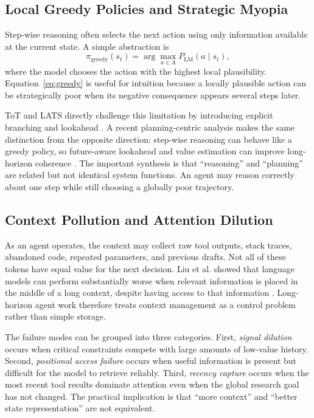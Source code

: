 \documentclass[manuscript,screen]{acmart}
\begin{document}
\subsection{Local Greedy Policies and Strategic Myopia}
Step-wise reasoning often selects the next action using only information available at the current state. A simple abstraction is
\begin{equation}
\pi_{\mathrm{greedy}}(s_t)=\arg\max_{a\in A} P_{\mathrm{LM}}(a\mid s_t),
\label{eq:greedy}
\end{equation}
where the model chooses the action with the highest local plausibility. Equation~\ref{eq:greedy} is useful for intuition because a locally plausible action can be strategically poor when its negative consequence appears several steps later.

ToT and LATS directly challenge this limitation by introducing explicit branching and lookahead \cite{yao2023tot,zhou2023lats}. A recent planning-centric analysis makes the same distinction from the opposite direction: step-wise reasoning can behave like a greedy policy, so future-aware lookahead and value estimation can improve long-horizon coherence \cite{wang2026flare}. The important synthesis is that ``reasoning'' and ``planning'' are related but not identical system functions. An agent may reason correctly about one step while still choosing a globally poor trajectory.

\subsection{Context Pollution and Attention Dilution}
As an agent operates, the context may collect raw tool outputs, stack traces, abandoned code, repeated parameters, and previous drafts. Not all of these tokens have equal value for the next decision. Liu et al. showed that language models can perform substantially worse when relevant information is placed in the middle of a long context, despite having access to that information \cite{liu2023lostmiddle}. Long-horizon agent work therefore treats context management as a control problem rather than simple storage.

The failure modes can be grouped into three categories. First, \emph{signal dilution} occurs when critical constraints compete with large amounts of low-value history. Second, \emph{positional access failure} occurs when useful information is present but difficult for the model to retrieve reliably. Third, \emph{recency capture} occurs when the most recent tool results dominate attention even when the global research goal has not changed. The practical implication is that ``more context'' and ``better state representation'' are not equivalent.
\end{document}
